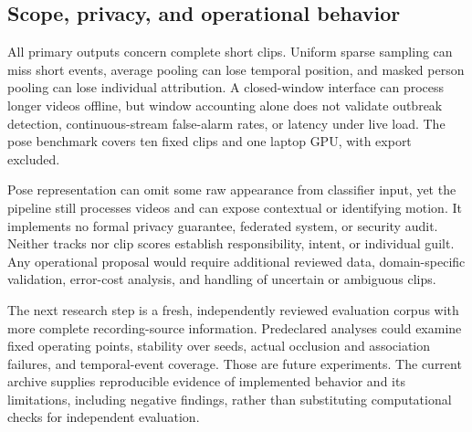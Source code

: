 \subsection{Scope, privacy, and operational behavior}
All primary outputs concern complete short clips. Uniform sparse sampling can miss short events, average pooling can lose temporal position, and masked person pooling can lose individual attribution. A closed-window interface can process longer videos offline, but window accounting alone does not validate outbreak detection, continuous-stream false-alarm rates, or latency under live load. The pose benchmark covers ten fixed clips and one laptop GPU, with export excluded.

Pose representation can omit some raw appearance from classifier input, yet the pipeline still processes videos and can expose contextual or identifying motion. It implements no formal privacy guarantee, federated system, or security audit. Neither tracks nor clip scores establish responsibility, intent, or individual guilt. Any operational proposal would require additional reviewed data, domain-specific validation, error-cost analysis, and handling of uncertain or ambiguous clips.

The next research step is a fresh, independently reviewed evaluation corpus with more complete recording-source information. Predeclared analyses could examine fixed operating points, stability over seeds, actual occlusion and association failures, and temporal-event coverage. Those are future experiments. The current archive supplies reproducible evidence of implemented behavior and its limitations, including negative findings, rather than substituting computational checks for independent evaluation.
